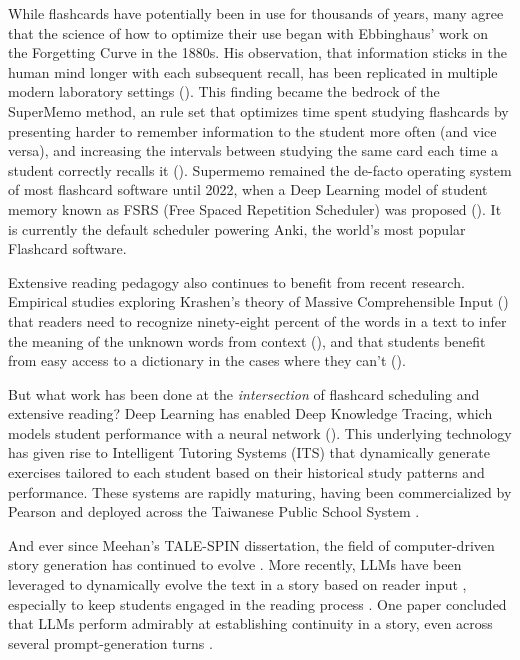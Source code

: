 \documentclass[
	letterpaper, %
]{jdf}
\newcommand{\pcite}[1]{(\cite{#1})}
\begin{document}
While flashcards have potentially been in use for thousands of years, many agree that the science of how to optimize their use began with Ebbinghaus' work on the Forgetting Curve in the 1880s. His observation, that information sticks in the human mind longer with each subsequent recall, has been replicated in multiple modern laboratory settings \pcite{Murre2015ReplicationAA}. This finding became the bedrock of the SuperMemo method, an rule set that optimizes time spent studying flashcards by presenting harder to remember information to the student more often (and vice versa), and increasing the intervals between studying the same card each time a student correctly recalls it \pcite{SuperMemo_Method_2023}. Supermemo remained the de-facto operating system of most flashcard software until 2022, when a Deep Learning model of student memory known as FSRS (Free Spaced Repetition Scheduler) was proposed \pcite{shortestpathrepetitionscheduling}. It is currently the default scheduler powering Anki, the world's most popular Flashcard software.

Extensive reading pedagogy also continues to benefit from recent research. Empirical studies exploring Krashen's theory of Massive Comprehensible Input \pcite{krashen1982principles} that readers need to recognize ninety-eight percent of the words in a text to infer the meaning of the unknown words from context \pcite{hu_2000}, and that students benefit from easy access to a dictionary in the cases where they can't \pcite{mcdonald2016}. 

But what work has been done at the \textit{intersection} of flashcard scheduling and extensive reading? Deep Learning has enabled Deep Knowledge Tracing, which models student performance with a neural network \pcite{deep_knowledge_tracing}. This underlying technology has given rise to Intelligent Tutoring Systems (ITS) that dynamically generate exercises tailored to each student based on their historical study patterns and performance. These systems are rapidly maturing, having been commercialized by Pearson and deployed across the Taiwanese Public School System \cite{taiwan_adaptive_testing}.

And ever since Meehan's TALE-SPIN dissertation, the field of computer-driven story generation has continued to evolve \cite{controllable_story_generation}.
More recently, LLMs have been leveraged to dynamically evolve the text in a story based on reader input \cite{ai_human_taking_turns_creating_story}, especially to keep students engaged in the reading process \cite{ye2023storypark}. One paper concluded that LLMs perform admirably at establishing continuity in a story, even across several prompt-generation turns \cite{controllable_story_generation}.
\end{document}
